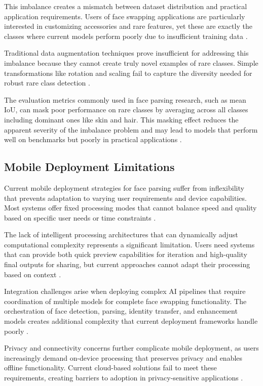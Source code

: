 \documentclass[12pt,a4paper]{report}
\begin{document}
This imbalance creates a mismatch between dataset distribution and practical application requirements. Users of face swapping applications are particularly interested in customizing accessories and rare features, yet these are exactly the classes where current models perform poorly due to insufficient training data \cite{lin2020attention}.

Traditional data augmentation techniques prove insufficient for addressing this imbalance because they cannot create truly novel examples of rare classes. Simple transformations like rotation and scaling fail to capture the diversity needed for robust rare class detection \cite{shorten2019survey}.

The evaluation metrics commonly used in face parsing research, such as mean IoU, can mask poor performance on rare classes by averaging across all classes including dominant ones like skin and hair. This masking effect reduces the apparent severity of the imbalance problem and may lead to models that perform well on benchmarks but poorly in practical applications \cite{milletari2016vnet}.

\subsection{Mobile Deployment Limitations}

Current mobile deployment strategies for face parsing suffer from inflexibility that prevents adaptation to varying user requirements and device capabilities. Most systems offer fixed processing modes that cannot balance speed and quality based on specific user needs or time constraints \cite{chen2022mobile}.

The lack of intelligent processing architectures that can dynamically adjust computational complexity represents a significant limitation. Users need systems that can provide both quick preview capabilities for iteration and high-quality final outputs for sharing, but current approaches cannot adapt their processing based on context \cite{wang2021adaptive}.

Integration challenges arise when deploying complex AI pipelines that require coordination of multiple models for complete face swapping functionality. The orchestration of face detection, parsing, identity transfer, and enhancement models creates additional complexity that current deployment frameworks handle poorly \cite{li2020mobile}.

Privacy and connectivity concerns further complicate mobile deployment, as users increasingly demand on-device processing that preserves privacy and enables offline functionality. Current cloud-based solutions fail to meet these requirements, creating barriers to adoption in privacy-sensitive applications \cite{xu2019federated}.
\end{document}
